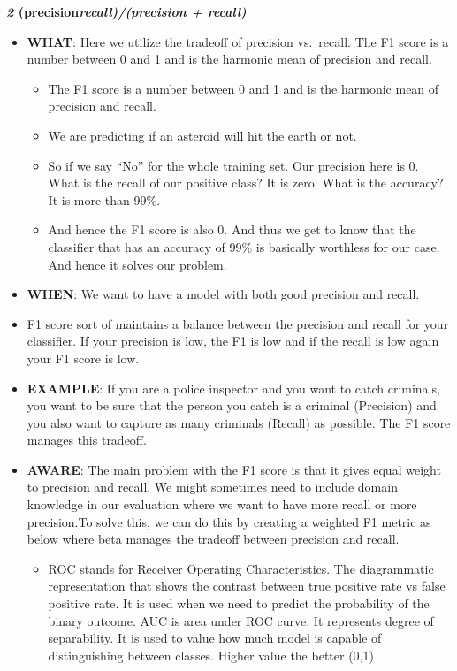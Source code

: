 \documentclass[
]{book}
\providecommand{\tightlist}{%
  \setlength{\itemsep}{0pt}\setlength{\parskip}{0pt}}
\begin{document}
\textbf{\emph{2} (precision\emph{recall)/(precision + recall)}}

\begin{itemize}
\item
  \textbf{WHAT}: Here we utilize the tradeoff of precision vs.~recall. The F1 score is a number between 0 and 1 and is the harmonic mean of precision and recall.

  \begin{itemize}
  \item
    The F1 score is a number between 0 and 1 and is the harmonic mean of precision and recall.
  \item
    We are predicting if an asteroid will hit the earth or not.
  \item
    So if we say ``No'' for the whole training set. Our precision here is 0. What is the recall of our positive class? It is zero. What is the accuracy? It is more than 99\%.
  \item
    And hence the F1 score is also 0. And thus we get to know that the classifier that has an accuracy of 99\% is basically worthless for our case. And hence it solves our problem.
  \end{itemize}
\item
  \textbf{WHEN}: We want to have a model with both good precision and recall.
\item
  F1 score sort of maintains a balance between the precision and recall for your classifier. If your precision is low, the F1 is low and if the recall is low again your F1 score is low.
\item
  \textbf{EXAMPLE}: If you are a police inspector and you want to catch criminals, you want to be sure that the person you catch is a criminal (Precision) and you also want to capture as many criminals (Recall) as possible. The F1 score manages this tradeoff.
\item
  \textbf{AWARE}: The main problem with the F1 score is that it gives equal weight to precision and recall. We might sometimes need to include domain knowledge in our evaluation where we want to have more recall or more precision.To solve this, we can do this by creating a weighted F1 metric as below where beta manages the tradeoff between precision and recall.

  \begin{itemize}
  \tightlist
  \item
    ROC stands for Receiver Operating Characteristics. The diagrammatic representation that shows the contrast between true positive rate vs false positive rate. It is used when we need to predict the probability of the binary outcome. AUC is area under ROC curve. It represents degree of separability. It is used to value how much model is capable of distinguishing between classes. Higher value the better (0,1)
  \end{itemize}
\end{itemize}
\end{document}
